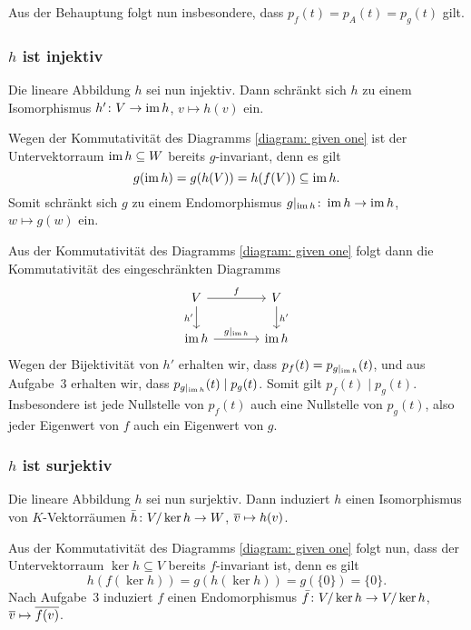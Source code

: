 Aus der Behauptung folgt nun insbesondere, dass $p_f(t) = p_A(t) = p_g(t)$ gilt.



\subsubsection{\texorpdfstring{$h$}{h} ist injektiv}

Die lineare Abbildung $h$ sei nun injektiv.
Dann schränkt sich $h$ zu einem Isomorphismus $h' \colon V \to \operatorname{im} h$, $v \mapsto h(v)$ ein.

Wegen der Kommutativität des Diagramms \eqref{diagram: given one} ist der Untervektorraum $\operatorname{im} h \subseteq W$ bereits $g$-invariant, denn es gilt
\[
            g(\operatorname{im} h)
  =         g(h(V))
  =         h(f(V))
  \subseteq \operatorname{im} h.
\]
Somit schränkt sich $g$ zu einem Endomorphismus $g|_{\operatorname{im} h} \colon \operatorname{im} h \to \operatorname{im} h$, $w \mapsto g(w)$ ein.

Aus der Kommutativität des Diagramms \eqref{diagram: given one} folgt dann die Kommutativität des eingeschränkten Diagramms
\[
  \begin{tikzcd}[column sep = large]
      V
      \arrow{r}{f}
      \arrow[swap]{d}{h'}
    & V
      \arrow{d}{h'}
    \\
      \im h
      \arrow{r}{g|_{\im h}}
    & \im h
  \end{tikzcd}
\]
Wegen der Bijektivität von $h'$ erhalten wir, dass $p_f(t) = p_{g|_{\operatorname{im} h}}(t)$, und aus Aufgabe~3 erhalten wir, dass $p_{g|_{\operatorname{im} h}}(t) \mathrel{|} p_g(t)$.
Somit gilt $p_f(t) \mid p_g(t)$.
Insbesondere ist jede Nullstelle von $p_f(t)$ auch eine Nullstelle von $p_g(t)$, also jeder Eigenwert von $f$ auch ein Eigenwert von $g$.



\subsubsection*{\texorpdfstring{$h$}{h} ist surjektiv}

Die lineare Abbildung $h$ sei nun surjektiv.
Dann induziert $h$ einen Isomorphismus von $K$-Vektorräumen $\bar{h} \colon V/\ker h \to W$, $\overline{v} \mapsto h(v)$.

Aus der Kommutativität des Diagramms \eqref{diagram: given one} folgt nun, dass der Untervektorraum $\ker h \subseteq V$ bereits $f$-invariant ist, denn es gilt
\[
    h(f(\ker h))
  = g(h(\ker h))
  = g(\{0\})
  = \{0\}.
\]
Nach Aufgabe~3 induziert $f$ einen Endomorphismus $\bar{f} \colon V/\ker h \to V/\ker h$, $\overline{v} \mapsto \overline{f(v)}$.

